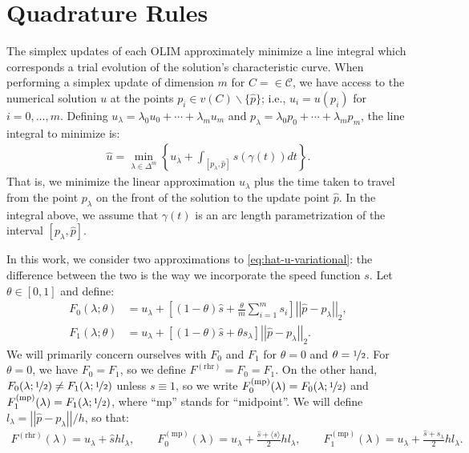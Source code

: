 \documentclass{article}
\newcommand{\Fmpzero}{F_0^{\operatorname{(mp)}}}
\newcommand{\Fmpone}{F_1^{\operatorname{(mp)}}}
\newcommand{\Frhr}{F^{\operatorname{(rhr)}}}
\newcommand{\calC}{\mathcal{C}}
\newcommand{\norm}[1]{\left|\left|#1\right|\right|}
\newcommand{\set}[1]{\left\{#1\right\}}
\newcommand{\squareb}[1]{\left[#1\right]}
\begin{document}
\section{Quadrature Rules}

The simplex updates of each OLIM approximately minimize a line
integral which corresponds a trial evolution of the solution's
characteristic curve. When performing a simplex update of dimension
$m$ for $C = \in \calC$, we have access to the numerical solution $u$
at the points $p_i \in v(C) \backslash \{\hat{p}\}$; i.e.,
$u_i = u(p_i)$ for $i = 0, \hdots, m$. Defining
$u_\lambda = \lambda_0 u_0 + \cdots + \lambda_m u_m$ and
$p_\lambda = \lambda_0 p_0 + \cdots + \lambda_m p_m$, the line
integral to minimize is:
\begin{align}\label{eq:hat-u-variational}
  \hat{u} = \min_{\lambda \in \Delta^m} \set{u_\lambda + \int_{[p_\lambda, \hat{p}]} s(\gamma(t))dt}.
\end{align}
That is, we minimize the linear approximation $u_\lambda$ plus the
time taken to travel from the point $p_\lambda$ on the front of the
solution to the update point $\hat{p}$. In the integral above, we
assume that $\gamma(t)$ is an arc length parametrization of the
interval $[p_\lambda, \hat{p}]$.

In this work, we consider two approximations to
\cref{eq:hat-u-variational}: the difference between the two is the way
we incorporate the speed function $s$. Let $\theta \in [0, 1]$ and
define:
\begin{align*}
  F_0(\lambda; \theta) &= u_\lambda + \squareb{(1-\theta)\hat{s} + \frac{\theta}{m} \sum_{i=1}^m s_i} \norm{\hat{p} - p_\lambda}_2, \\
  F_1(\lambda; \theta) &= u_\lambda + \squareb{(1-\theta)\hat{s} + \theta s_\lambda} \norm{\hat{p} - p_\lambda}_2.
\end{align*}
We will primarily concern ourselves with $F_0$ and $F_1$ for
$\theta = 0$ and $\theta = \nicefrac{1}{2}$. For $\theta = 0$, we have
$F_0 = F_1$, so we define $\Frhr = F_0 = F_1$. On the other hand,
$F_0(\lambda;\nicefrac{1}{2}) \neq F_1(\lambda;\nicefrac{1}{2})$
unless $s \equiv 1$, so we write
$\Fmpzero(\lambda) = F_0(\lambda; \nicefrac{1}{2})$ and
$\Fmpone(\lambda) = F_1(\lambda; \nicefrac{1}{2})$, where ``mp''
stands for ``midpoint''. We will define
$l_\lambda = \norm{\hat{p} - p_\lambda}/h$, so that:
\begin{align*}
  \Frhr(\lambda) = u_\lambda + \hat{s} h l_\lambda, \qquad \Fmpzero(\lambda) = u_\lambda + \frac{\hat{s} + \langle s \rangle}{2} h l_\lambda, \qquad \Fmpone(\lambda) = u_\lambda + \frac{\hat{s} + s_\lambda}{2} h l_\lambda.
\end{align*}
\end{document}
